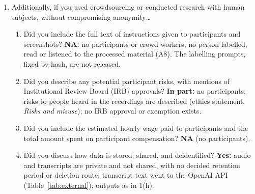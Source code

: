 {\begin{enumerate}
\item Additionally, if you used crowdsourcing or conducted research with human subjects, without compromising anonymity\ldots
\begin{enumerate}
\item Did you include the full text of instructions given to participants and screenshots? \textbf{NA:} no participants or crowd workers; no person labelled, read or listened to the processed material (A8). The labelling prompts, fixed by hash, are not released.
\item Did you describe any potential participant risks, with mentions of Institutional Review Board (IRB) approvals? \textbf{In part:} no participants; risks to people heard in the recordings are described (ethics statement, \emph{Risks and misuse}); no IRB approval or exemption exists.
\item Did you include the estimated hourly wage paid to participants and the total amount spent on participant compensation? \textbf{NA} (no participants).
\item Did you discuss how data is stored, shared, and deidentified? \textbf{Yes:} audio and transcripts are private and not shared, with no decided retention period or deletion route; transcript text went to the OpenAI API (Table~\ref{tab:external}); outputs as in 1(h).
\end{enumerate}
\end{enumerate}
}
